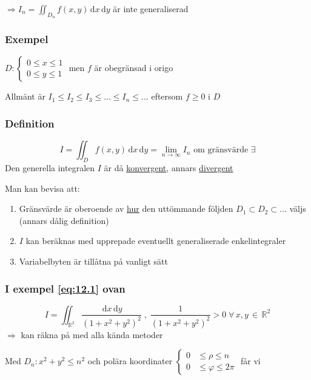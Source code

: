 \documentclass[a4paper]{article}
\newcommand{\de}[1]{\,\mathrm{d}#1}
\begin{document}
$\Rightarrow I_n = \iint_{D_n} f(x,y)\de{x}\de{y}$ är inte generaliserad

\subsubsection{Exempel}

$D:
\begin{cases}
	0 \leq x \leq 1 \\
	0 \leq y \leq 1
\end{cases}$ men $f$ är obegränsad i origo \newline

Allmänt är $I_1 \leq I_2 \leq I_3 \leq ... \leq I_n \leq ...$ eftersom $f \geq 0$ i $D$

\subsubsection{Definition}

$$
	I = \iint_D f(x,y) \de{x}\de{y} = \lim_{n \rightarrow \infty} I_n \text{ om gränsvärde } \exists
$$
Den generella integralen $I$ är då \underline{konvergent}, annars \underline{divergent}

\newpage

Man kan bevisa att:

\begin{enumerate}
\item Gränsvärde är oberoende av \underline{hur} den uttömmande följden $D_1 \subset D_2 \subset ...$ väljs (annars dålig definition)
\item $I$ kan beräknas med upprepade eventuellt generaliserade enkelintegraler
\item Variabelbyten är tillåtna på vanligt sätt
\end{enumerate}

\subsubsection{I exempel \texorpdfstring{\eqref{eq:12.1}}{12.1} ovan}

$$
	I = \iint_{\mathbb{R}^2} \frac{\de{x}\de{y}}{(1+x^2+y^2)^2} \;,\; \frac{1}{(1+x^2+y^2)^2} > 0 \; \forall\, x,y \,\in\,\mathbb{R}^2
$$
$\Rightarrow$ kan räkna på med alla kända metoder \newline

Med $D_n: x^2 + y^2 \leq n^2$ och polära koordinater $
\begin{cases}
	0 &\leq \rho \leq n \\
	0 &\leq \varphi \leq 2\pi
\end{cases}$
får vi
\end{document}

